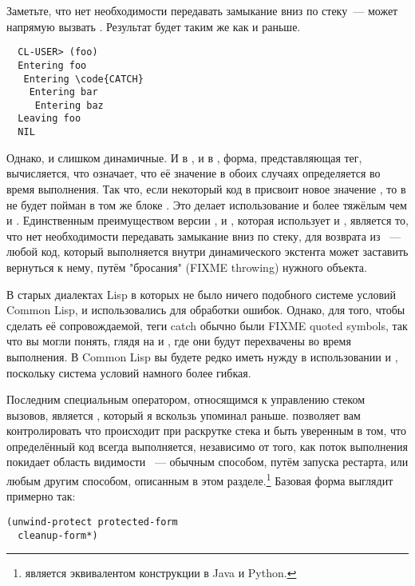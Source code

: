 Заметьте, что нет необходимости передавать замыкание вниз по стеку~---  может
напрямую вызвать .  Результат будет таким же как и раньше.

\begin{verbatim}
  CL-USER> (foo)
  Entering foo
   Entering \code{CATCH}
    Entering bar
     Entering baz
  Leaving foo
  NIL
\end{verbatim}

Однако,  и  слишком динамичные.  И в , и в
, форма, представляющая тег, вычисляется, что означает, что её значение в
обоих случаях определяется во время выполнения.  Так что, если некоторый код в 
присвоит новое значение , то  в  не будет пойман в том
же блоке .  Это делает использование  и  более тяжёлым
чем  и . Единственным преимуществом версии ,
 и , которая использует  и , является то, что
нет необходимости передавать замыкание вниз по стеку, для возврата из ~---
любой код, который выполняется внутри динамического экстента  может заставить
вернуться к нему, путём "бросания" (FIXME throwing) нужного объекта.

В старых диалектах Lisp в которых не было ничего подобного системе условий Common Lisp,
 и  использовались для обработки ошибок.  Однако, для того, чтобы
сделать её сопровождаемой, теги catch обычно были FIXME quoted symbols, так что вы могли
понять, глядя на  и , где они будут перехвачены во время
выполнения. В Common Lisp вы будете редко иметь нужду в использовании  и
, поскольку система условий намного более гибкая.

Последним специальным оператором, относящимся к управлению стеком вызовов, является
, который я вскользь упоминал раньше.  позволяет
вам контролировать что происходит при раскрутке стека и быть уверенным в том, что
определённый код всегда выполняется, независимо от того, как поток выполнения покидает
область видимости ~--- обычным способом, путём запуска рестарта, или
любым другим способом, описанным в этом разделе.\footnote{ является
  эквивалентом конструкции  в Java и Python.}  Базовая форма
 выглядит примерно так:

\begin{lstlisting}
(unwind-protect protected-form
  cleanup-form*)
\end{lstlisting}

